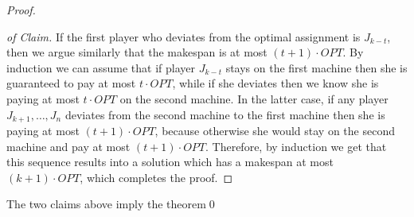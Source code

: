 \documentclass[runningheads]{llncs}
\begin{document}
\begin{proof}
\begin{proof}[of Claim]
	If the first player who deviates from the optimal assignment is $J_{k-t}$, then we argue similarly that the makespan is at most $(t+1) \cdot OPT$. By induction we can assume that if player $J_{k-t}$ stays on the first machine then she is guaranteed to pay at most $t\cdot OPT$, while if she deviates then we know she is paying at most $t\cdot OPT$ on the second machine. In the latter case, if any player $J_{k+1}, \ldots, J_{n}$ deviates from the second machine to the first machine then she is paying at most $(t+1) \cdot OPT$, because otherwise she would stay on the second machine and pay at most $(t+1) \cdot OPT$. Therefore, by induction we get that this sequence results into a solution which has a makespan at most $(k+1)\cdot OPT$, which completes the proof.
\end{proof}

%

The two claims above imply the theorem\qed\end{proof}
\end{document}
